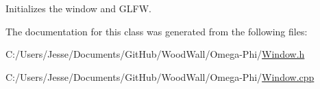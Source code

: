 Initializes the window and G\+L\+FW. 



The documentation for this class was generated from the following files\+:\begin{DoxyCompactItemize}
\item 
C\+:/\+Users/\+Jesse/\+Documents/\+Git\+Hub/\+Wood\+Wall/\+Omega-\/\+Phi/\mbox{\hyperlink{_window_8h}{Window.\+h}}\item 
C\+:/\+Users/\+Jesse/\+Documents/\+Git\+Hub/\+Wood\+Wall/\+Omega-\/\+Phi/\mbox{\hyperlink{_window_8cpp}{Window.\+cpp}}\end{DoxyCompactItemize}
